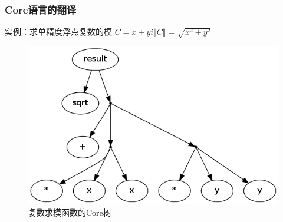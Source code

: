 \documentclass{beamer}
\begin{document}
\begin{frame}
  \frametitle{Core语言的翻译}
  \begin{block}{实例：求单精度浮点复数的模}
    $C=x+yi$\hspace{3cm}$\Vert C \Vert = \sqrt{x^2+y^2}$
  \end{block}
  \pause
  
  \pause
  \begin{figure}
    \caption{复数求模函数的Core树}
    \includegraphics[scale=0.2]{images/complex-length.png}
  \end{figure}
\end{frame}
\end{document}
